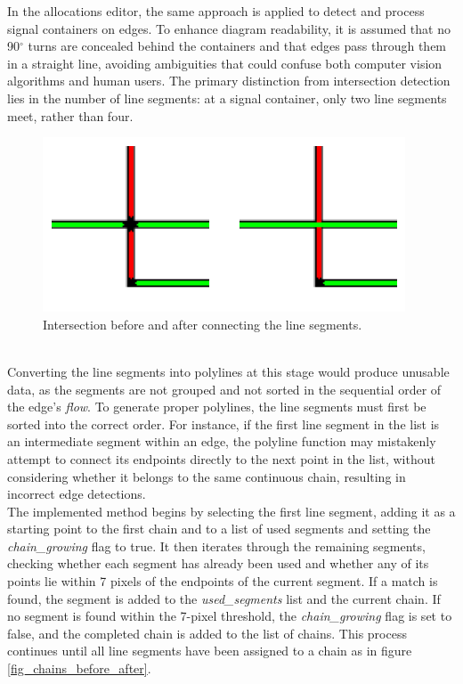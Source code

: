 In the allocations editor, the same approach is applied to detect and process signal containers on edges. To enhance diagram readability, it is assumed that no 90$^{\circ}$ turns are concealed behind the containers and that edges pass through them in a straight line, avoiding ambiguities that could confuse both computer vision algorithms and human users. The primary distinction from intersection detection lies in the number of line segments: at a signal container, only two line segments meet, rather than four.
\begin{figure}[h]
    \centering
    \includegraphics[width=0.7\linewidth]{Pictures/intersection_before_after.png}
    \caption{Intersection before and after connecting the line segments.}
    \label{fig:_intersection_before_after}
\end{figure}\\
Converting the line segments into polylines at this stage would produce unusable data, as the segments are not grouped and not sorted in the sequential order of the edge's \textit{flow}. To generate proper polylines, the line segments must first be sorted into the correct order. For instance, if the first line segment in the list is an intermediate segment within an edge, the polyline function may mistakenly attempt to connect its endpoints directly to the next point in the list, without considering whether it belongs to the same continuous chain, resulting in incorrect edge detections.\\
The implemented method begins by selecting the first line segment, adding it as a starting point to the first chain and to a list of used segments and setting the \textit{chain\_growing} flag to true. It then iterates through the remaining segments, checking whether each segment has already been used and whether any of its points lie within 7 pixels of the endpoints of the current segment. If a match is found, the segment is added to the \textit{used\_segments} list and the current chain. If no segment is found within the 7-pixel threshold, the \textit{chain\_growing} flag is set to false, and the completed chain is added to the list of chains. This process continues until all line segments have been assigned to a chain as in figure \ref{fig_chains_before_after}.
